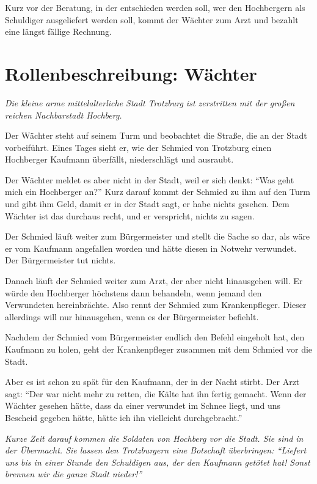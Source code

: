 Kurz vor der Beratung, in der entschieden werden soll, wer den Hochbergern als Schuldiger ausgeliefert werden soll, kommt der Wächter zum Arzt und bezahlt eine längst fällige Rechnung.
\newpage

\section*{Rollenbeschreibung: Wächter}

\emph{Die kleine arme mittelalterliche Stadt Trotzburg ist zerstritten mit der großen reichen Nachbarstadt Hochberg.}

Der Wächter steht auf seinem Turm und beobachtet die Straße, die an der Stadt vorbeiführt. Eines Tages sieht er, wie der Schmied von Trotzburg einen Hochberger Kaufmann überfällt, niederschlägt und ausraubt.

Der Wächter meldet es aber nicht in der Stadt, weil er sich denkt: "`Was geht mich ein Hochberger an?"' Kurz darauf kommt der Schmied zu ihm auf den Turm und gibt ihm Geld, damit er in der Stadt sagt, er habe nichts gesehen. Dem Wächter ist das durchaus recht, und er verspricht, nichts zu sagen.

Der Schmied läuft weiter zum Bürgermeister und stellt die Sache so dar, als wäre er vom Kaufmann angefallen worden und hätte diesen in Notwehr verwundet. Der Bürgermeister tut nichts.

Danach läuft der Schmied weiter zum Arzt, der aber nicht hinausgehen will. Er würde den Hochberger höchstens dann behandeln, wenn jemand den Verwundeten hereinbrächte. Also rennt der Schmied zum Krankenpfleger. Dieser allerdings will nur hinausgehen, wenn es der Bürgermeister befiehlt.

Nachdem der Schmied vom Bürgermeister endlich den Befehl eingeholt hat, den Kaufmann zu holen, geht der Krankenpfleger zusammen mit dem Schmied vor die Stadt.

Aber es ist schon zu spät für den Kaufmann, der in der Nacht stirbt. Der Arzt sagt: "`Der war nicht mehr zu retten, die Kälte hat ihn fertig gemacht. Wenn der Wächter gesehen hätte, dass da einer verwundet im Schnee liegt, und uns Bescheid gegeben hätte, hätte ich ihn vielleicht durchgebracht."'

\emph{Kurze Zeit darauf kommen die Soldaten von Hochberg vor die Stadt. Sie sind in der Übermacht. Sie lassen den Trotzburgern eine Botschaft überbringen: "`Liefert uns bis in einer Stunde den Schuldigen aus, der den Kaufmann getötet hat! Sonst brennen wir die ganze Stadt nieder!"'}

